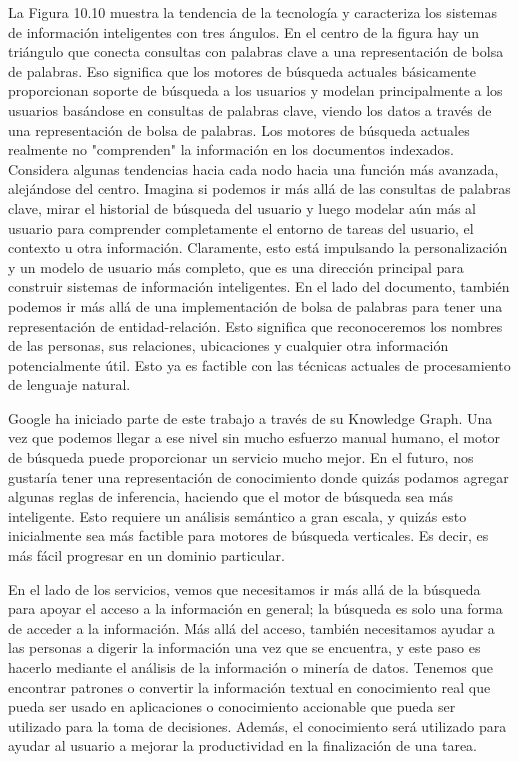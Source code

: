 La Figura 10.10 muestra la tendencia de la tecnología y caracteriza los sistemas de información inteligentes con tres ángulos. En el centro de la figura hay un triángulo que conecta consultas con palabras clave a una representación de bolsa de palabras. Eso significa que los motores de búsqueda actuales básicamente proporcionan soporte de búsqueda a los usuarios y modelan principalmente a los usuarios basándose en consultas de palabras clave, viendo los datos a través de una representación de bolsa de palabras. Los motores de búsqueda actuales realmente no "comprenden" la información en los documentos indexados. Considera algunas tendencias hacia cada nodo hacia una función más avanzada, alejándose del centro. Imagina si podemos ir más allá de las consultas de palabras clave, mirar el historial de búsqueda del usuario y luego modelar aún más al usuario para comprender completamente el entorno de tareas del usuario, el contexto u otra información. Claramente, esto está impulsando la personalización y un modelo de usuario más completo, que es una dirección principal para construir sistemas de información inteligentes. En el lado del documento, también podemos ir más allá de una implementación de bolsa de palabras para tener una representación de entidad-relación. Esto significa que reconoceremos los nombres de las personas, sus relaciones, ubicaciones y cualquier otra información potencialmente útil. Esto ya es factible con las técnicas actuales de procesamiento de lenguaje natural.

Google ha iniciado parte de este trabajo a través de su Knowledge Graph. Una vez que podemos llegar a ese nivel sin mucho esfuerzo manual humano, el motor de búsqueda puede proporcionar un servicio mucho mejor. En el futuro, nos gustaría tener una representación de conocimiento donde quizás podamos agregar algunas reglas de inferencia, haciendo que el motor de búsqueda sea más inteligente. Esto requiere un análisis semántico a gran escala, y quizás esto inicialmente sea más factible para motores de búsqueda verticales. Es decir, es más fácil progresar en un dominio particular.

En el lado de los servicios, vemos que necesitamos ir más allá de la búsqueda para apoyar el acceso a la información en general; la búsqueda es solo una forma de acceder a la información. Más allá del acceso, también necesitamos ayudar a las personas a digerir la información una vez que se encuentra, y este paso es hacerlo mediante el análisis de la información o minería de datos. Tenemos que encontrar patrones o convertir la información textual en conocimiento real que pueda ser usado en aplicaciones o conocimiento accionable que pueda ser utilizado para la toma de decisiones. Además, el conocimiento será utilizado para ayudar al usuario a mejorar la productividad en la finalización de una tarea.

